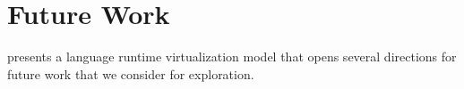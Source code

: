 %
%
%
%
%
%
%
%
%

\section{Future Work}

\Vtt presents a language runtime virtualization model that opens several directions for future work that we consider for exploration.

